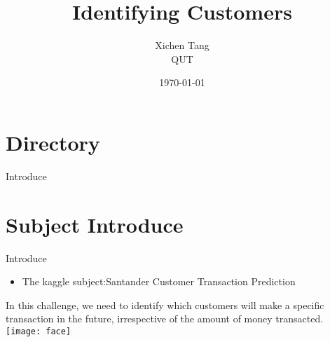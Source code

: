 \documentclass[
 size=12pt,
 paper=smartboard, %
 mode=present, %
 display=slides, %
style=tuliplab,
pauseslide,
fleqn,leqno]{powerdot}
\title{Identifying Customers
}
\author{
Xichen Tang
\\
QUT
}
\date{\today}
\begin{document}
\maketitle
\section{Directory}
\begin{slide}[toc=,bm=]{Introduce}
\tableofcontents[content=sections,type=1]
\end{slide}
\section{Subject Introduce}
\begin{slide}[toc=,bm=]{Introduce}
\begin{itemize}
\item The kaggle subject:Santander Customer Transaction Prediction

\end{itemize}
In this challenge, we need to identify which customers will make a specific transaction in the future, irrespective of the amount of money transacted.
\texttt{[image: face]}
\end{slide}
\end{document}
